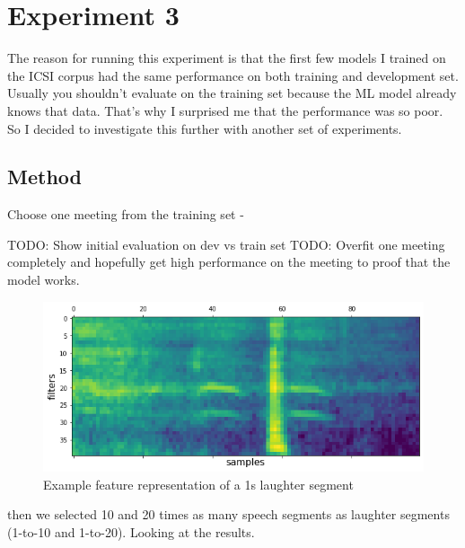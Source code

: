 \documentclass[bsc,frontabs,parskip,deptreport]{infthesis}
\begin{document}
\section{Experiment 3}
The reason for running this experiment is that the first few models I trained on the ICSI corpus had the same performance on both training and development set.
Usually you shouldn't evaluate on the training set because the ML model already knows that data. That's why I surprised me that the performance was so poor. So I decided to investigate this further with another set of experiments.

\subsection{Method}
Choose one meeting from the training set - 

TODO: Show initial evaluation on dev vs train set
TODO: Overfit one meeting completely and hopefully get high performance on the meeting to proof that the model works.

\begin{figure}[htp]
    \centering
    \includegraphics[width=14cm]{imgs/sample_fbank_feat.png}
    \caption{Example feature representation of a 1s laughter segment}
    \label{fig:fbank-sample}
\end{figure}


\label{table:data-df}

then we selected 10 and 20 times as many speech segments as laughter segments (1-to-10 and 1-to-20). 
Looking at the results.



\end{document}

